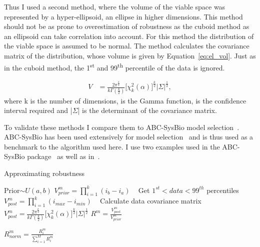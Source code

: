 Thus I used a second method, where the volume of the viable space was represented by a hyper-ellipsoid, an ellipse in higher dimensions. This method should not be as prone to overestimation of robustness as the cuboid method as an ellipsoid can take correlation into account. For this method the distribution of the viable space is assumed to be normal. The method calculates the covariance matrix of the distribution, whose volume is given by Equation~\ref{eq:el_vol}. Just as in the cuboid method, the 1\textsuperscript{st} and 99\textsuperscript{th} percentile of the data is ignored. 

\begin{align}
	V & = \frac{2\pi^{\frac{k}{2}}}{k\Gamma(\frac{k}{2})} \Big[ \chi _{k}^{2}(\alpha) \Big]^{\frac{k}{2}} |\Sigma|^\frac{1}{2}, \label{eq:el_vol}
\end{align}
\noindent where k is the number of dimensions, \textGamma{} is the Gamma function, \textalpha{} is the confidence interval required and |$\Sigma$| is the determinant of the covariance matrix. %

To validate these methods I compare them to ABC-SysBio model selection~\autocite{Liepe:2014iw}. ABC-SysBio has been used extensively for model selection~\autocite{Toni:2009tr, Toni:2011jy, Barnes:2011hh} and is thus used as a benchmark to the algorithm used here. I use two examples used in the ABC-SysBio package~\autocite{Toni:2009tr} as well as in~\textcite{Toni:2010}. 


\begin{algorithm}[htbp]
\caption{Approximating robustness}
\label{alg:robustness}

 \begin{algorithmic}[1]
    \Statex
		\State Prior$\sim U(a, b)$
    	\State $V_{prior}^{m} = \prod_{i=1}^{k} (i_{b} - i_{a})$ \
		\Statex
			\State Get $1^{st} < data < 99^{th}$ percentiles
    		\State $V_{post}^{m} = \prod_{i=1}^{k} (i_{max} - i_{min})$ \
    		\EndIf
			\If{Ellipsoid calculation}
				\State Calculate data covariance matrix
    			\State $V_{post}^{m} = \frac{2\pi^{\frac{k}{2}}}{k\Gamma(\frac{k}{2})} \Big[ \chi _{k}^{2}(\alpha) \Big]^{\frac{k}{2}} |\Sigma|^\frac{1}{2}$
    		\EndIf
			\Statex
			\State $R^{m} = \frac{V_{post}^{m}}{V_{prior}^{m}}$
			
			\State $R_{norm}^{m} = \frac{R^{m}_i}{\sum_{i=1}^{M} R^m_i }$
		\EndFor
  \end{algorithmic}
\end{algorithm}	

